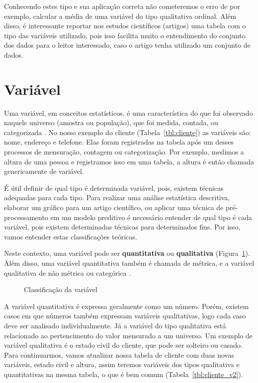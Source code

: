 \documentclass[a4paper,12pt]{book}
\begin{document}
Conhecendo estes tipo e sua aplicação correta não cometeremos o erro de por exemplo, calcular a média de uma variável do tipo qualitativa ordinal. Além disso, é interessante reportar nos estudos científicos (artigos) uma tabela com o tipo das variáveis utilizado, pois isso facilita muito o entendimento do conjunto dos dados para o leitor interessado, caso o artigo tenha utilizado um conjunto de dados.

\section{Variável}

Uma variável, em conceitos estatísticos, é uma característica do que foi observado naquele universo (amostra ou população), que foi medida,  contada, ou categorizada \cite{favero2017manual}. No nosso exemplo do cliente (Tabela~\ref{tbl:cliente}) as variáveis são: nome, endereço e telefone. Elas foram registradas na tabela após um desses processos de mensuração, contagem ou categorização. Por exemplo, medimos a altura de uma pessoa e registramos isso em uma tabela, a altura é então chamada genericamente de variável.

É útil definir de qual tipo é determinada variável, pois, existem técnicas adequadas para cada tipo. Para realizar uma análise estatística descritiva, elaborar um gráfico para um artigo científico, ou aplicar uma técnica de pré-processamento em um modelo preditivo é necessário entender de qual tipo é cada variável, pois existem determinadas técnicas para determinados fins. Por isso, vamos entender estas classificações teóricas.

Neste contexto, uma variável pode ser \textbf{quantitativa} ou \textbf{qualitativa} (Figura~\ref{fig:tipodado}). Além disso, uma variável quantitativa também é chamada de métrica, e a variável qualitativa de não métrica ou categórica \cite{favero2017manual}.

\begin{figure}
	\centering
	\caption{Classificação da variável}
	\label{fig:tipodado}
\end{figure}

A variável quantitativa é expressa geralmente como um número. Porém, existem casos em que números também expressam variáveis qualitativas, logo cada caso deve ser analisado individualmente. Já a variável do tipo qualitativa está relacionado ao pertencimento do valor mensurado a um universo. Um exemplo de variável qualitativa é o estado civil do cliente, que pode ser solteiro ou casado. Para continuarmos, vamos atualizar nossa tabela de cliente com duas novas variáveis, estado civil e altura, assim teremos variáveis dos tipos qualitativa e quantitativas  na mesma tabela, o que é bem comum (Tabela~\ref{tbl:cliente_v2}).
\end{document}

